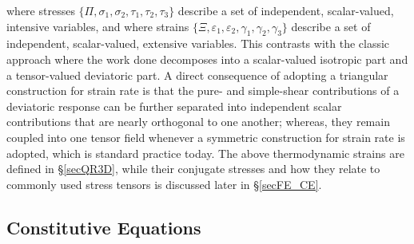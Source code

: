 where stresses $\{ \Pi , \sigma_1 , \sigma_2 , \tau_1 , \tau_2 , \tau_3  \}$ describe a set of independent, scalar-valued, intensive variables, and where strains $\{ \Xi , \varepsilon_1 , \varepsilon_2 , \gamma_1 , \gamma_2 , \gamma_3 \}$ describe a set of independent, scalar-valued, extensive variables.  This contrasts with the classic approach where the work done decomposes into a scalar-valued isotropic part and a tensor-valued deviatoric part.  A direct consequence of adopting a triangular construction for strain rate is that the pure- and simple-shear contributions of a deviatoric response can be further separated into independent scalar contributions that are nearly orthogonal to one another; whereas, they remain coupled into one tensor field whenever a symmetric construction for strain rate is adopted, which is standard practice today.  The above thermo\-dynamic strains are defined in \S\ref{secQR3D}, while their conjugate stresses and how they relate to commonly used stress tensors is discussed later in \S\ref{secFE_CE}. 

\subsection{Constitutive Equations}

